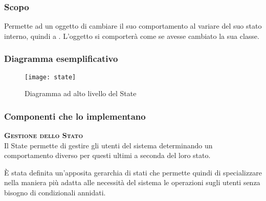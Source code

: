 \subsubsection{Scopo}
Permette ad un oggetto di cambiare il suo comportamento al variare del suo stato interno, quindi a . L'oggetto si comporterà come se avesse cambiato la sua classe.

\subsubsection{Diagramma esemplificativo}
\begin{figure}[H]
\centering
\texttt{[image: state]}
\caption{Diagramma ad alto livello del  State}\label{fig:state}
\end{figure}

\subsubsection{Componenti che lo implementano}
\begin{description}
\item{\scshape\bfseries Gestione dello Stato}\\
Il  State permette di gestire gli utenti del sistema determinando un comportamento diverso per questi ultimi a seconda del loro stato.

È stata definita un'apposita gerarchia di stati che permette quindi di specializzare nella maniera più adatta alle necessità del sistema le operazioni sugli utenti senza bisogno di condizionali annidati.
\end{description}
\clearpage

